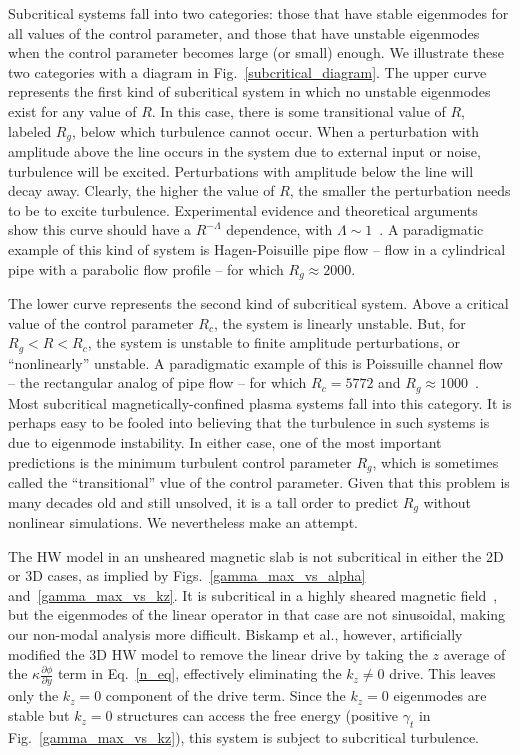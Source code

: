 \documentclass[letter,scriptaddress,twocolumn, prl,showkeys]{revtex4}
\newcommand{\pdiff}[2]{\frac{\partial#1}{\partial#2}}
\begin{document}
Subcritical systems fall into two categories: those that have stable eigenmodes for all values of the control parameter, and those that have unstable eigenmodes
when the control parameter becomes large (or small) enough. We illustrate these two categories with a diagram in Fig.~\ref{subcritical_diagram}. 
The upper curve represents the first kind of subcritical system in which no unstable eigenmodes exist for any value of $R$. In this
case, there is some transitional value of $R$, labeled $R_g$, below which turbulence cannot occur. When a perturbation with amplitude above the line occurs in the system due to external input or noise, 
turbulence will be excited. Perturbations with amplitude below the line will decay away. Clearly, the higher the value of $R$, the smaller the perturbation needs to be to excite turbulence.
Experimental evidence and theoretical arguments show this curve should have a $R^{-\Lambda}$ dependence, with $\Lambda \sim 1$~\cite{grossmann2000}.
A paradigmatic example of this kind of system is Hagen-Poisuille pipe flow -- flow in a cylindrical pipe with a parabolic flow profile -- for which $R_g \approx 2000$.

The lower curve represents the second kind of subcritical system. Above a critical value of the control parameter $R_c$, the system is linearly unstable. But, for $R_g < R < R_c$, the system is
unstable to finite amplitude perturbations, or ``nonlinearly'' unstable. A paradigmatic example of this is Poissuille channel flow -- the rectangular analog of pipe flow -- for which
$R_c = 5772$ and $R_g \approx 1000$~\cite{grossmann2000}. Most subcritical magnetically-confined plasma systems fall into this category. It is perhaps easy to be fooled into believing that the turbulence
in such systems is due to eigenmode instability. In either case, one of the most important predictions is the minimum turbulent control parameter $R_g$, which is sometimes called the ``transitional''
vlue of the control parameter. Given that this problem is many decades old
and still unsolved, it is a tall order to predict $R_g$ without nonlinear simulations. We nevertheless make an attempt.

The HW model in an unsheared magnetic slab is not subcritical in either the 2D or 3D cases, as implied by Figs.~\ref{gamma_max_vs_alpha} and~\ref{gamma_max_vs_kz}. It is subcritical in a highly sheared
magnetic field~\cite{drake1995}, but the eigenmodes of the linear operator in that case are not sinusoidal, making our non-modal analysis more difficult. 
Biskamp et al., however, artificially modified the
3D HW model to remove the linear drive by taking the $z$ average of the $\kappa \pdiff{\phi}{y}$ term in Eq.~\ref{n_eq}, effectively eliminating the $k_z \ne 0$ drive. This leaves only the $k_z = 0$
component of the drive term. Since the $k_z = 0$ eigenmodes are stable but $k_z = 0$ structures can access the free energy (positive $\gamma_t$ in Fig.~\ref{gamma_max_vs_kz}), this system is subject
to subcritical turbulence.
\end{document}
